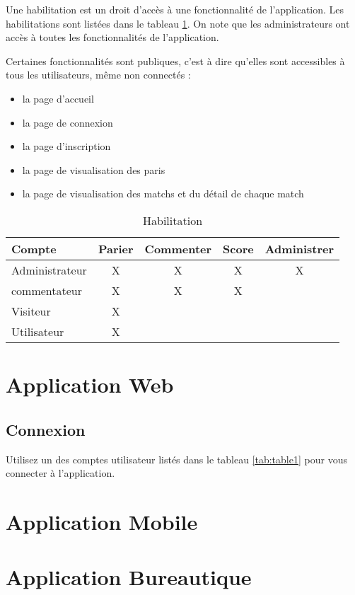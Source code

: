 \documentclass{book}
\begin{document}
Une habilitation est un droit d'accès à une fonctionnalité de l'application. Les habilitations sont listées 
dans le tableau \ref{tab:table2}. On note que les administrateurs ont accès à toutes les fonctionnalités de
l'application. 

Certaines fonctionnalités sont publiques, c'est à dire qu'elles sont accessibles à tous les utilisateurs, même non connectés :
\begin{itemize}
  \item la page d'accueil
  \item la page de connexion
  \item la page d'inscription
  \item la page de visualisation des paris
  \item la page de visualisation des matchs et du détail de chaque match
\end{itemize}

\begin{table}
  \label{tab:table2}
    \begin{tabular}{l|c|c|c|c} \toprule
      \textbf{Compte} & \textbf{Parier} & \textbf{Commenter} & \textbf{Score} & \textbf{Administrer} \\ \hline
      Administrateur & X & X & X & X  \\ \hline
      commentateur & X & X & X &  \\ \hline
      Visiteur & X & & & \\ \hline
      Utilisateur & X & & & \\ \hline
    \end{tabular}
    \caption{Habilitation}
\end{table}


\chapter{Application Web}

\section{Connexion}

Utilisez un des comptes utilisateur listés dans le tableau \ref{tab:table1} pour vous connecter à l'application.

\chapter{Application Mobile}


\chapter{Application Bureautique}


\begin{appendix}
    \listoffigures
    \listoftables
  \end{appendix}
\end{document}
